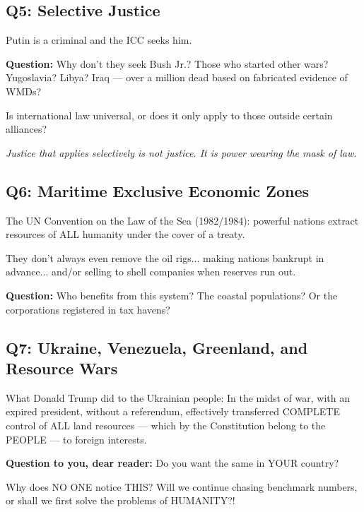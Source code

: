 \documentclass[11pt,a4paper]{article}
\theoremstyle{definition}
\theoremstyle{remark}
\begin{document}
\subsection{Q5: Selective Justice}

Putin is a criminal and the ICC seeks him.

\textbf{Question:} Why don't they seek Bush Jr.? Those who started other wars? Yugoslavia? Libya? Iraq — over a million dead based on fabricated evidence of WMDs?

Is international law universal, or does it only apply to those outside certain alliances?

\textit{Justice that applies selectively is not justice. It is power wearing the mask of law.}

\subsection{Q6: Maritime Exclusive Economic Zones}

The UN Convention on the Law of the Sea (1982/1984): powerful nations extract resources of ALL humanity under the cover of a treaty.

They don't always even remove the oil rigs... making nations bankrupt in advance... and/or selling to shell companies when reserves run out.

\textbf{Question:} Who benefits from this system? The coastal populations? Or the corporations registered in tax havens?

\subsection{Q7: Ukraine, Venezuela, Greenland, and Resource Wars}

What Donald Trump did to the Ukrainian people: In the midst of war, with an expired president, without a referendum, effectively transferred COMPLETE control of ALL land resources — which by the Constitution belong to the PEOPLE — to foreign interests.

\textbf{Question to you, dear reader:} Do you want the same in YOUR country?

Why does NO ONE notice THIS? Will we continue chasing benchmark numbers, or shall we first solve the problems of HUMANITY?!
\end{document}
